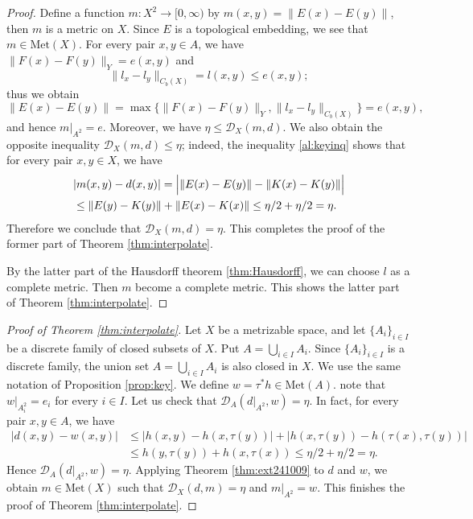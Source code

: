 \documentclass[a4paper, 12pt]{amsart}
\theoremstyle{plain}
\theoremstyle{definition}
\theoremstyle{remark}
\newcommand{\met}[1]{\mathrm{Met}(#1)}
\newcommand{\metdis}{\mathcal{D}}
\begin{document}
\begin{proof}
Define a function 
$m:X^2\to [0, \infty)$ 
by 
$m(x, y)=\|E(x)-E(y)\|$, 
then 
$m$ 
is a metric on 
$X$. 
Since 
$E$
 is a topological embedding, 
we see that 
$m\in \met{X}$. 
For every 
pair  
$x, y\in A$, 
we have 
$\|F(x)-F(y)\|_{Y}=e(x, y)$ 
and 
	\[
	\|l_{x}-l_{y}\|_{C_{b}(X)}=l(x, y)\le e(x, y);
	\] 
thus we obtain 
	\[
	\|E(x)-E(y)\|=\max\{\|F(x)-F(y)\|_{Y}, \|l_{x}-l_{y}\|_{C_{b}(X)}\}=e(x, y), 
	\]
and hence 
$m|_{A^2}=e$. 
Moreover,  
we have 
$\eta\le \metdis_{X}(m, d)$. 
We also obtain the opposite inequality 
$\metdis_X(m, d)\le \eta$;
indeed, 
the inequality 
\eqref{al:keyinq}
shows that 
for every pair 
$x, y\in X$, we have 
\begin{align*}
	&|m(x, y)-d(x, y)|=\Bigl|\|E(x)-E(y)\|-\|K(x)-K(y)\|\Bigr|
	\\
	&\le \|E(y)-K(y)\|+\|E(x)-K(x)\|
	\le \eta/2 +\eta/2=\eta. 
\end{align*}
Therefore we conclude that 
$\metdis_{X}(m, d)=\eta$. 
This completes the proof of the  former part of Theorem 
\ref{thm:interpolate}. 

By the latter part of the Hausdorff theorem \ref{thm:Hausdorff}, 
we can choose $l$ as a complete metric. 
Then $m$ become a complete metric. 
This shows  the  latter part of Theorem \ref{thm:interpolate}. 
\end{proof}


\begin{proof}[Proof of Theorem \ref{thm:interpolate}]
Let 
$X$ 
be a metrizable space, and let 
$\{A_{i}\}_{i\in I}$ 
be a discrete family of closed subsets of 
$X$. 
Put $A=\bigcup_{i\in I}A_{i}$. 
Since $\{A_{i}\}_{i\in I}$ is a discrete family, 
the union set 
$A=\bigcup_{i\in I}A_{i}$ is 
also closed in 
$X$. 
We use the same notation of
Proposition 
\ref{prop:key}. 
We define 
$w=\tau^{*}h\in \met{A}$. 
note that 
$w|_{A_{i}^{2}}=e_{i}$ 
for every 
$i\in I$. 
Let us check that 
$\metdis_{A}(d|_{A^{2}}, w)=\eta$. 
In fact, 
for every 
pair 
$x, y\in A$, we have 
\begin{align*}
|d(x, y)-w(x, y)|&\le |h(x, y)-h(x, \tau(y))|+|h(x, \tau(y))-h(\tau(x), \tau(y))|\\
&\le h(y, \tau(y))+h(x, \tau(x))\le \eta/2+\eta/2=\eta. 
\end{align*}
Hence 
$\metdis_{A}(d|_{A^{2}}, w)=\eta$. 
Applying 
Theorem 
\ref{thm:ext241009}
to 
$d$ 
and 
$w$, 
we obtain 
$m\in \met{X}$ such that 
$\metdis_{X}(d, m)=\eta$ and 
$m|_{A^{2}}=w$.
This finishes the proof of Theorem \ref{thm:interpolate}. 
\end{proof}
\end{document}
